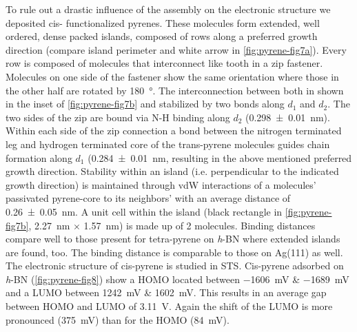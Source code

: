 To rule out a drastic influence of the assembly on the electronic structure we deposited cis- functionalized pyrenes. These molecules form extended, well ordered, dense packed islands, composed of rows along a preferred growth direction (compare island perimeter and white arrow in \autoref{fig:pyrene-fig7a}). Every row is composed of molecules that interconnect like tooth in a zip fastener. Molecules on one side of the fastener show the same orientation where those in the other half are rotated by \SI{180}{\degree}. The interconnection between both in shown in the inset of \autoref{fig:pyrene-fig7b} and stabilized by two bonds along $d_1$ and $d_2$. The two sides of the zip are bound via N-H binding along $d_2$ (\SI{0.298 \pm 0.01}{\nano \meter}). Within each side of the zip connection a bond between the nitrogen terminated leg and hydrogen terminated core of the trans-pyrene molecules guides chain formation along $d_1$ (\SI{0.284 \pm 0.01}{\nano \meter}, resulting in the above mentioned preferred growth direction. Stability within an island (i.e. perpendicular to the indicated growth direction) is maintained through vdW interactions of a molecules’ passivated pyrene-core to its neighbors’ with an average distance of \SI{0.26 \pm 0.05}{\nano \meter}. A unit cell within the island (black rectangle in \autoref{fig:pyrene-fig7b}, \SI{2.27}{\nano \meter} $\times$ \SI{1.57}{\nano \meter}) is made up of 2 molecules. Binding distances compare well to those present for tetra-pyrene on \textit{h}-BN where extended islands are found, too. The binding distance is comparable to those on Ag(111) as well. \cite{Kaposi_Supramolecular_2016}
The electronic structure of cis-pyrene is studied in STS. Cis-pyrene adsorbed on \textit{h}-BN (\autoref{fig:pyrene-fig8}) show a HOMO located between \SI{-1606}{\milli \volt} \& \SI{-1689}{\milli \volt} and a LUMO between \SI{1242}{\milli \volt} \& \SI{1602}{\milli \volt}. This results in an average gap between HOMO and LUMO of \SI{3.11}{\volt}. Again the shift of the LUMO is more pronounced (\SI{375}{\milli \volt}) than for the HOMO (\SI{84}{\milli \volt}). 

